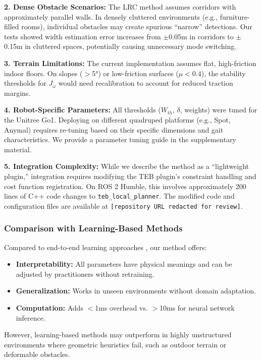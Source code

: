 \documentclass[lettersize,journal]{IEEEtran}
\begin{document}
\textbf{2. Dense Obstacle Scenarios:} The LRC method assumes corridors with approximately parallel walls. In densely cluttered environments (e.g., furniture-filled rooms), individual obstacles may create spurious ``narrow'' detections. Our tests showed width estimation error increases from $\pm$0.05m in corridors to $\pm$0.15m in cluttered spaces, potentially causing unnecessary mode switching.

\textbf{3. Terrain Limitations:} The current implementation assumes flat, high-friction indoor floors. On slopes ($>$5°) or low-friction surfaces ($\mu < 0.4$), the stability thresholds for $J_{\dot{\omega}}$ would need recalibration to account for reduced traction margins.

\textbf{4. Robot-Specific Parameters:} All thresholds ($W_{th}$, $\delta$, weights) were tuned for the Unitree Go1. Deploying on different quadruped platforms (e.g., Spot, Anymal) requires re-tuning based on their specific dimensions and gait characteristics. We provide a parameter tuning guide in the supplementary material.

\textbf{5. Integration Complexity:} While we describe the method as a ``lightweight plugin,'' integration requires modifying the TEB plugin's constraint handling and cost function registration. On ROS 2 Humble, this involves approximately 200 lines of C++ code changes to \texttt{teb\_local\_planner}. The modified code and configuration files are available at \texttt{[repository URL redacted for review]}.

\subsubsection{Comparison with Learning-Based Methods}
Compared to end-to-end learning approaches \cite{kolvenbachLearningbasedObstacleAvoidance2022}, our method offers:
\begin{itemize}
\item \textbf{Interpretability:} All parameters have physical meanings and can be adjusted by practitioners without retraining.
\item \textbf{Generalization:} Works in unseen environments without domain adaptation.
\item \textbf{Computation:} Adds $<$1ms overhead vs. $>$10ms for neural network inference.
\end{itemize}
However, learning-based methods may outperform in highly unstructured environments where geometric heuristics fail, such as outdoor terrain or deformable obstacles.
\end{document}
